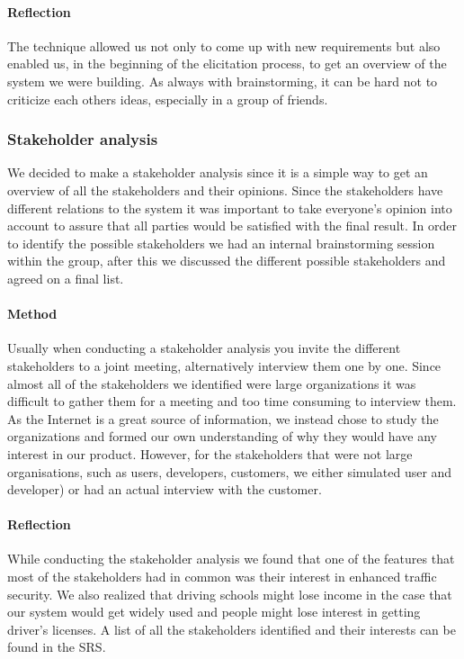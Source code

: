 \documentclass[10pt]{article}
\begin{document}
\paragraph{Reflection}
\hfill \break
The technique allowed us not only to come up with new requirements but also enabled us, in the beginning of the elicitation process, to get an overview of the system we were building. As always with brainstorming, it can be hard not to criticize each others ideas, especially in a group of friends.

\subsubsection{Stakeholder analysis}
We decided to make a stakeholder analysis since it is a simple way to get an overview of all the stakeholders and their opinions. Since the stakeholders have different relations to the system it was important to take everyone's opinion into account to assure that all parties would be satisfied with the final result. In order to identify the possible stakeholders we had an internal brainstorming session within the group, after this we discussed the different possible stakeholders and agreed on a final list.

\paragraph{Method}
\hfill \break
Usually when conducting a stakeholder analysis you invite the different stakeholders to a joint meeting, alternatively interview them one by one. Since almost all of the stakeholders we identified were large organizations it was difficult to gather them for a meeting and too time consuming to interview them. As the Internet is a great source of information, we instead chose to study the organizations and formed our own understanding of why they would have any interest in our product. However, for the stakeholders that were not large organisations, such as users, developers, customers, we either simulated user and developer) or had an actual interview with the customer.

\paragraph{Reflection}
\hfill \break
While conducting the stakeholder analysis we found that one of the features that most of the stakeholders had in common was their interest in enhanced traffic security. We also realized that driving schools might lose income in the case that our system would get widely used and people might lose interest in getting driver's licenses. A list of all the stakeholders identified and their interests can be found in the SRS\cite{srs}. 
\end{document}
